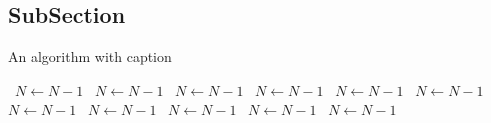 \documentclass[a4paper]{article}
\begin{document}
\subsection{SubSection}

\begin{algorithm}
\caption{An algorithm with caption}
\begin{algorithmic}
\    \State $N \gets N - 1$
\    \State $N \gets N - 1$
\    \State $N \gets N - 1$
\    \State $N \gets N - 1$
\    \State $N \gets N - 1$
\    \State $N \gets N - 1$
\    \State $N \gets N - 1$
\    \State $N \gets N - 1$
\    \State $N \gets N - 1$
\    \State $N \gets N - 1$
\    \State $N \gets N - 1$
\EndWhile
\end{algorithmic}
\end{algorithm}
\end{document}
